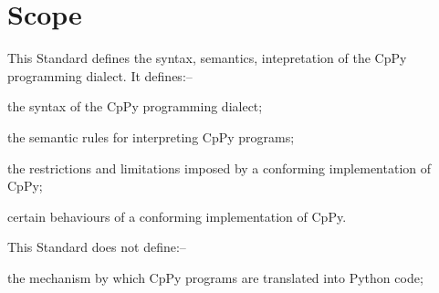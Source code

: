 \section{Scope}

This Standard defines the syntax, semantics, intepretation of the CpPy programming
dialect. It defines:--
\begin{dashlist}
    \item the syntax of the CpPy programming dialect;
    \item the semantic rules for interpreting CpPy programs;
    \item the restrictions and limitations imposed by a conforming implementation of CpPy;
    \item certain behaviours of a conforming implementation of CpPy.
\end{dashlist}

This Standard does not define:--
\begin{dashlist}
    \item the mechanism by which CpPy programs are translated into Python code;
\end{dashlist}